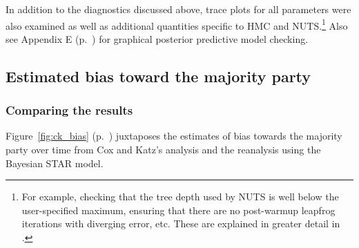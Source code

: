 %
%
%

In addition to the diagnostics discussed above, trace plots for all parameters were also 
examined as well as additional quantities specific to HMC and NUTS.\footnote{For example, 
checking that the tree depth used by NUTS is well below the user-specified maximum, ensuring 
that there are no post-warmup leapfrog iterations with diverging error, etc. These are explained 
in greater detail in .} 
Also see Appendix E (p.~\pageref{AppendixE}) %
for graphical posterior predictive model checking. 


\subsection[Estimates and discussion]{Estimated bias toward the majority party}
\label{results}

\subsubsection{Comparing the results}

Figure~\ref{fig:ck_bias} (p.~\pageref{fig:ck_bias}) juxtaposes the estimates of 
bias towards the majority party over time from Cox and Katz's analysis and the reanalysis 
using the Bayesian STAR model.

